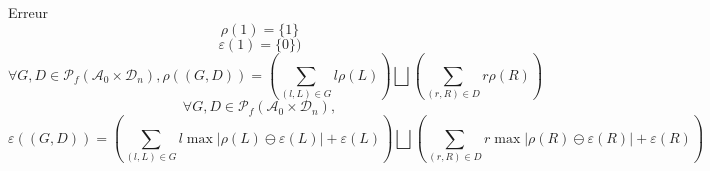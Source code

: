 \begin{frame}{Erreur}
$$\rho(\boxed{1}) = \{1\}$$
$$\varepsilon(\boxed{1}) = \{0\})$$
$$\forall G, D \in \mathscr{P}_f(\mathcal{A}_0 \times \mathcal{D}_n),
\rho((G, D))
= \left(\sum_{(l, L) \in G} l \rho(L) \right) \bigsqcup \left(\sum_{(r, R) \in D} r \rho(R) \right)$$
$$
\forall G, D \in \mathscr{P}_f(\mathcal{A}_0 \times \mathcal{D}_n),$$
$$\varepsilon((G, D))
= \left(\sum_{(l, L) \in G} l \max|\rho(L) \ominus \varepsilon(L)| + \varepsilon(L)\right)
\bigsqcup \left(\sum_{(r, R) \in D} r \max|\rho(R) \ominus \varepsilon(R)| + \varepsilon(R)\right)
$$
\end{frame}